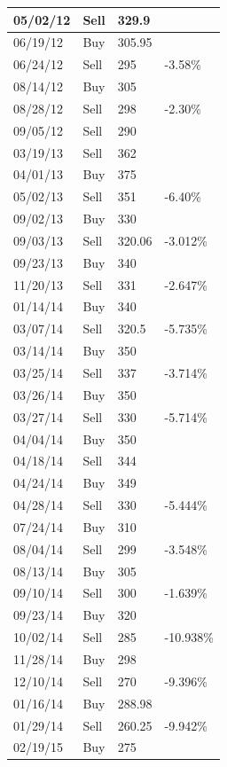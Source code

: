 \begin{apendicesenv}
\begin{center}
\begin{longtable}{| p{4cm} | p{4cm} |p{4cm} |p{2cm} |}
	
	05/02/12	&Sell	&329.9	&\\ \hline
	06/19/12	&Buy	&305.95	&\\ \hline
	06/24/12	&Sell	&295	&-3.58\%\\ \hline
	08/14/12	&Buy	&305	&\\ \hline
	08/28/12	&Sell	&298	&-2.30\%\\ \hline
	09/05/12	&Sell	&290	&\\ \hline
	03/19/13	&Sell	&362	&\\ \hline
	04/01/13	&Buy	&375	&\\ \hline
	05/02/13	&Sell	&351	&-6.40\%\\ \hline
	09/02/13	&Buy	&330	&\\ \hline
	09/03/13	&Sell	&320.06	&-3.012\%\\ \hline
	09/23/13	&Buy	&340	&\\ \hline
	11/20/13	&Sell	&331	&-2.647\%\\ \hline
	01/14/14	&Buy	&340	&\\ \hline
	03/07/14	&Sell	&320.5	&-5.735\%\\ \hline
	03/14/14	&Buy	&350	&\\ \hline
	03/25/14	&Sell	&337	&-3.714\%\\ \hline
	03/26/14	&Buy	&350	&\\ \hline
	03/27/14	&Sell	&330	&-5.714\%\\ \hline
	04/04/14	&Buy	&350	&\\ \hline
	04/18/14	&Sell	&344	&\\ \hline
	04/24/14	&Buy	&349	&\\ \hline
	04/28/14	&Sell	&330	&-5.444\%\\ \hline
	07/24/14	&Buy	&310	&\\ \hline
	08/04/14	&Sell	&299	&-3.548\%\ \\ \hline
	08/13/14	&Buy	&305	&\\ \hline
	09/10/14	&Sell	&300	&-1.639\%\\ \hline
	09/23/14	&Buy	&320	&\\ \hline
	10/02/14	&Sell	&285	&-10.938\%\\ \hline
	11/28/14	&Buy	&298	&\\ \hline
	12/10/14	&Sell	&270	&-9.396\%\\ \hline
	01/16/14	&Buy	&288.98	&\\ \hline
	01/29/14	&Sell	&260.25	&-9.942\%\\ \hline
	02/19/15	&Buy	&275	&\\ \hline


\end{longtable}
\end{center}
\end{apendicesenv}
